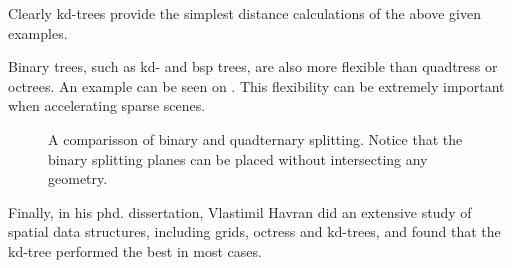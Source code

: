 Clearly kd-trees provide the simplest distance calculations of the
above given examples.


Binary trees, such as kd- and bsp trees, are also more flexible than
quadtress or octrees. An example can be seen on
. This flexibility can be extremely important
when accelerating sparse scenes.

\begin{figure}
  \centering
  \hspace{20pt}
  \caption[Comparisson of binary and quadternary splitting]{A
    comparisson of binary and quadternary splitting. Notice that the
    binary splitting planes can be placed without intersecting any
    geometry.}
  \label{fig:binQuadSplit}
\end{figure}


Finally, in his phd. dissertation, Vlastimil Havran did an extensive
study of spatial data structures, including grids, octress and
kd-trees, and found that the kd-tree performed the best in most cases.

